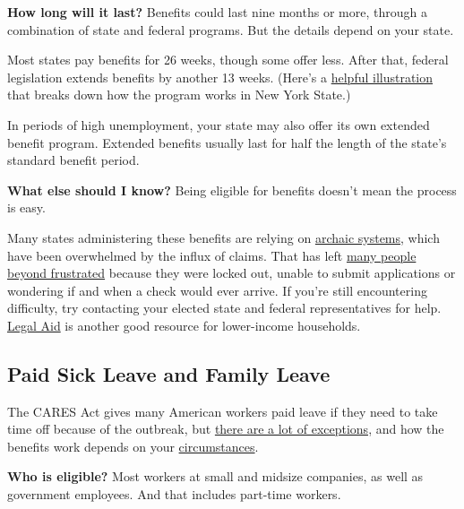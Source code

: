 \textbf{How long will it last?} Benefits could last nine months or more,
through a combination of state and federal programs. But the details
depend on your state.

Most states pay benefits for 26 weeks, though some offer less. After
that, federal legislation extends benefits by another 13 weeks. (Here's
a \href{https://labor.ny.gov/ui/cares-act.shtm}{helpful illustration}
that breaks down how the program works in New York State.)

In periods of high unemployment, your state may also offer its own
extended benefit program. Extended benefits usually last for half the
length of the state's standard benefit period.

\textbf{What else should I know?} Being eligible for benefits doesn't
mean the process is easy.

Many states administering these benefits are relying on
\href{https://www.nytimes3xbfgragh.onion/2020/04/17/nyregion/coronavirus-pandemic-unemployment-assistance-ny-delays.html}{archaic
systems}, which have been overwhelmed by the influx of claims. That has
left
\href{https://www.nytimes3xbfgragh.onion/2020/04/23/us/florida-coronavirus-unemployment.html}{many
people}
\href{https://www.nytimes3xbfgragh.onion/2020/05/08/nyregion/unemployment-benefits-ny-coronavirus.html}{beyond
frustrated} because they were locked out, unable to submit applications
or wondering if and when a check would ever arrive. If you're still
encountering difficulty, try contacting your elected state and federal
representatives for help.
\href{https://www.americanbar.org/groups/legal_services/flh-home/flh-free-legal-help/}{Legal
Aid} is another good resource for lower-income households.

\hypertarget{paid-sick-leave-and-family-leave}{%
\subsection{Paid Sick Leave and Family
Leave}\label{paid-sick-leave-and-family-leave}}

The CARES Act gives many American workers paid leave if they need to
take time off because of the outbreak, but
\href{https://www.nytimes3xbfgragh.onion/2020/03/14/opinion/coronavirus-pelosi-sick-leave.html}{there
are a lot of exceptions,} and how the benefits work depends on your
\href{https://www.nytimes3xbfgragh.onion/2020/05/08/upshot/virus-paid-leave-pandemic.html}{circumstances}.

\textbf{Who is eligible?} Most workers at small and midsize companies,
as well as government employees. And that includes part-time workers.

